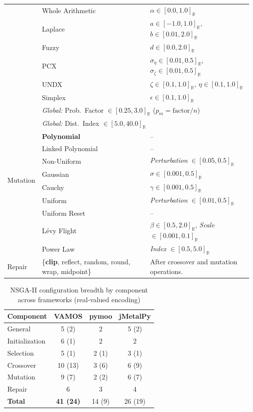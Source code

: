 \documentclass[final,5p,times,twocolumn]{elsarticle}
\newcommand{\Realdomain}[1]{[#1]_{\mathbb{R}}}
\begin{document}
\begin{table}[htbp]
{\begin{tabular}{lll}
 & Whole Arithmetic & $\alpha \in \Realdomain{0.0, 1.0}$ \\
 & Laplace & $a \in \Realdomain{-1.0, 1.0}$, $b \in \Realdomain{0.01, 2.0}$ \\
 & Fuzzy & $d \in \Realdomain{0.0, 2.0}$ \\
 & PCX & $\sigma_\eta \in \Realdomain{0.01, 0.5}$, $\sigma_\zeta \in \Realdomain{0.01, 0.5}$ \\
 & UNDX & $\zeta \in \Realdomain{0.1, 1.0}$, $\eta \in \Realdomain{0.1, 1.0}$ \\
 & Simplex & $\epsilon \in \Realdomain{0.1, 1.0}$ \\ \midrule
\multirow{11}{*}{Mutation} & \multicolumn{2}{l}{\textit{Global:} Prob.\ Factor $\in \Realdomain{0.25, 3.0}$ ($p_m = \text{factor}/n$)} \\
 & \multicolumn{2}{l}{\textit{Global:} Dist.\ Index $\in \Realdomain{5.0, 40.0}$} \\
 & \textbf{Polynomial} & -- \\
 & Linked Polynomial & -- \\
 & Non-Uniform & \textit{Perturbation} $\in \Realdomain{0.05, 0.5}$ \\
 & Gaussian & $\sigma \in \Realdomain{0.001, 0.5}$ \\
 & Cauchy & $\gamma \in \Realdomain{0.001, 0.5}$ \\
 & Uniform & \textit{Perturbation} $\in \Realdomain{0.01, 0.5}$ \\
 & Uniform Reset & -- \\
 & L\'evy Flight & $\beta \in \Realdomain{0.5, 2.0}$, \textit{Scale} $\in \Realdomain{0.001, 0.1}$ \\
 & Power Law & \textit{Index} $\in \Realdomain{0.5, 5.0}$ \\ \midrule
\multirow{1}{*}{Repair} & \{\textbf{clip}, reflect, random, round, wrap, midpoint\} & After crossover and mutation operations. \\ \bottomrule
\end{tabular}%
}
\end{table}

\begin{table}[htbp]
\centering
\caption{NSGA-II configuration breadth by component across frameworks (real-valued encoding)}
\label{tab:parameter_space_summary}
\begin{tabular}{lccc}
\toprule
\textbf{Component} & \textbf{VAMOS} & \textbf{pymoo} & \textbf{jMetalPy} \\
\midrule
General & 5 (2) & 2 & 5 (2) \\
Initialization & 6 (1) & 2 & 2 \\
Selection & 5 (1) & 2 (1) & 3 (1) \\
Crossover & 10 (13) & 3 (6) & 6 (9) \\
Mutation & 9 (7) & 2 (2) & 6 (7) \\
Repair & 6 & 3 & 4 \\
\midrule
\textbf{Total} & \textbf{41 (24)} & 14 (9) & 26 (19) \\
\bottomrule
\end{tabular}
\end{table}
\end{document}
